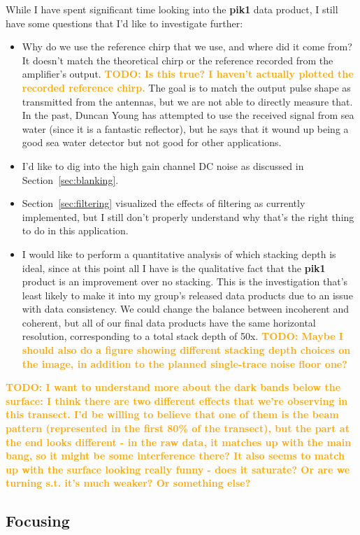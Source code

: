 \documentclass[11pt]{article}
\newcommand{\future}[1]{\ifthenelse{\boolean{include-future}} {\textcolor{Orange}{\textbf{TODO: #1}}}{}}
\newcommand{\secref}[1]{Section~\ref{#1}}
\begin{document}
While I have spent significant time looking into the \textbf{pik1} data product, I still have some questions that I'd like to investigate further:
\begin{itemize}
\item Why do we use the reference chirp that we use, and where did it come from? It doesn't match the theoretical chirp or the reference recorded from the amplifier's output. \future{Is this true? I haven't actually plotted the recorded reference chirp.} The goal is to match the output pulse shape as transmitted from the antennas, but we are not able to directly measure that. In the past, Duncan Young has attempted to use the received signal from sea water (since it is a fantastic reflector), but he says that it wound up being a good sea water detector but not good for other applications.
\item I'd like to dig into the high gain channel DC noise as discussed in \secref{sec:blanking}.
\item \secref{sec:filtering} visualized the effects of filtering as currently implemented, but I still don't properly understand why that's the right thing to do in this application.
\item I would like to perform a quantitative analysis of which stacking depth is ideal, since at this point all I have is the qualitative fact that the \textbf{pik1} product is an improvement over no stacking. This is the investigation that's least likely to make it into my group's released data products due to an issue with data consistency. We could change the balance between incoherent and coherent, but all of our final data products have the same horizontal resolution, corresponding to a total stack depth of 50x. \future{Maybe I should also do a figure showing different stacking depth choices on the image, in addition to the planned single-trace noise floor one?}
\end{itemize}

\future{I want to understand more about the dark bands below the surface: I think there are two different effects that we're observing in this transect. I'd be willing to believe that one of them is the beam pattern (represented in the first 80\% of the transect), but the part at the end looks different - in the raw data, it matches up with the main bang, so it might be some interference there? It also seems to match up with the surface looking really funny - does it saturate? Or are we turning s.t. it's much weaker? Or something else?}

\subsection{Focusing}
\label{sec:focusing}
\end{document}
